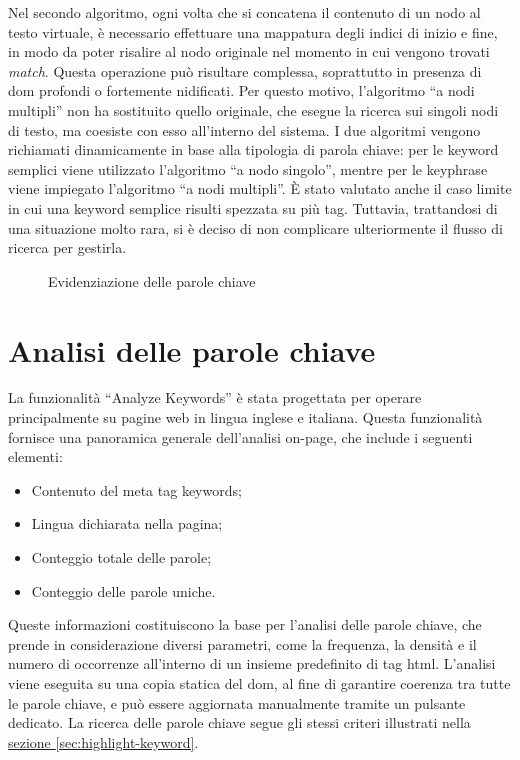 \vspace{10pt}
\par\noindent Nel secondo algoritmo, ogni volta che si concatena il contenuto di un nodo al testo virtuale, è necessario effettuare una mappatura degli indici di inizio e fine, in modo da poter risalire al nodo originale nel momento in cui vengono trovati \textit{match}. Questa operazione può risultare complessa, soprattutto in presenza di \gls{dom} profondi o fortemente nidificati. Per questo motivo, l’algoritmo “a nodi multipli” non ha sostituito quello originale, che esegue la ricerca sui singoli nodi di testo, ma coesiste con esso all’interno del sistema. I due algoritmi vengono richiamati dinamicamente in base alla tipologia di parola chiave: per le keyword semplici viene utilizzato l’algoritmo “a nodo singolo”, mentre per le keyphrase viene impiegato l’algoritmo “a nodi multipli”. È stato valutato anche il caso limite in cui una keyword semplice risulti spezzata su più tag. Tuttavia, trattandosi di una situazione molto rara, si è deciso di non complicare ulteriormente il flusso di ricerca per gestirla.

\begin{figure}[H]
  \centering 
  \caption{Evidenziazione delle parole chiave}
  \label{fig:highlight_keyword}
\end{figure}

\section{Analisi delle parole chiave}
\label{sec:analyze-keyword}

\par La funzionalità “Analyze Keywords” è stata progettata per operare principalmente su pagine web in lingua inglese e italiana. Questa funzionalità fornisce una panoramica generale dell'analisi \gls{on-page}, che include i seguenti elementi:
\begin{itemize}
  \item Contenuto del meta tag keywords;
  \item Lingua dichiarata nella pagina;
  \item Conteggio totale delle parole;
  \item Conteggio delle parole uniche.
\end{itemize}

\vspace{5pt}
\par\noindent Queste informazioni costituiscono la base per l'analisi delle parole chiave, che prende in considerazione diversi parametri, come la frequenza, la densità e il numero di occorrenze all’interno di un insieme predefinito di tag \gls{html}. L'analisi viene eseguita su una copia statica del \gls{dom}, al fine di garantire coerenza tra tutte le parole chiave, e può essere aggiornata manualmente tramite un pulsante dedicato. La ricerca delle parole chiave segue gli stessi criteri illustrati nella \hyperref[sec:highlight-keyword]{sezione \textsection\ref*{sec:highlight-keyword}}.

